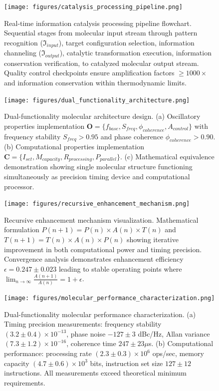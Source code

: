 \begin{figure}[H]
\centering
\texttt{[image: figures/catalysis\_processing\_pipeline.png]}
\caption{Real-time information catalysis processing pipeline flowchart. Sequential stages from molecular input stream through pattern recognition ($\mathfrak{I}_{input}$), target configuration selection, information channeling ($\mathfrak{I}_{output}$), catalytic transformation execution, information conservation verification, to catalyzed molecular output stream. Quality control checkpoints ensure amplification factors $\geq 1000\times$ and information conservation within thermodynamic limits.}
\label{fig:catalysis_pipeline}
\end{figure}


\begin{figure}[H]
\centering
\texttt{[image: figures/dual\_functionality\_architecture.png]}
\caption{Dual-functionality molecular architecture design. (a) Oscillatory properties implementation $\boldsymbol{O} = \{f_{base}, S_{freq}, \phi_{coherence}, A_{control}\}$ with frequency stability $S_{freq} > 0.95$ and phase coherence $\phi_{coherence} > 0.90$. (b) Computational properties implementation $\boldsymbol{C} = \{I_{set}, M_{capacity}, R_{processing}, P_{parallel}\}$. (c) Mathematical equivalence demonstration showing single molecular structure functioning simultaneously as precision timing device and computational processor.}
\label{fig:dual_functionality}
\end{figure}

\begin{figure}[H]
\centering
\texttt{[image: figures/recursive\_enhancement\_mechanism.png]}
\caption{Recursive enhancement mechanism visualization. Mathematical formulation $P(n+1) = P(n) \times A(n) \times T(n)$ and $T(n+1) = T(n) \times A(n) \times P(n)$ showing iterative improvement in both computational power and timing precision. Convergence analysis demonstrates enhancement efficiency $\epsilon = 0.247 \pm 0.023$ leading to stable operating points where $\lim_{n \to \infty} \frac{A(n+1)}{A(n)} = 1 + \epsilon$.}
\label{fig:recursive_enhancement}
\end{figure}

\begin{figure}[H]
\centering
\texttt{[image: figures/molecular\_performance\_characterization.png]}
\caption{Dual-functionality molecular performance characterization. (a) Timing precision measurements: frequency stability $(3.2 \pm 0.4) \times 10^{-13}$, phase noise $-127 \pm 3$ dBc/Hz, Allan variance $(7.3 \pm 1.2) \times 10^{-16}$, coherence time $247 \pm 23 \mu$s. (b) Computational performance: processing rate $(2.3 \pm 0.3) \times 10^6$ ops/sec, memory capacity $(4.7 \pm 0.6) \times 10^3$ bits, instruction set size $127 \pm 12$ instructions. All measurements exceed theoretical minimum requirements.}
\label{fig:molecular_performance}
\end{figure}

